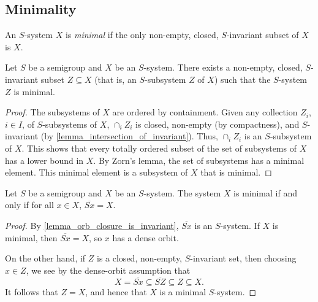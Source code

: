 \subsection{Minimality}

\begin{definition}
    \label{def_minimal_system}
    \leanok{}
    An $S$-system $X$ is \emph{minimal} if the only non-empty, closed, $S$-invariant subset of $X$ is $X$.
\end{definition}

\begin{theorem}
\label{thm_every_system_has_minimal_subsystem}
\leanok{}
    Let $S$ be a semigroup and $X$ be an $S$-system.  There exists a non-empty, closed, $S$-invariant subset $Z \subseteq X$ (that is, an $S$-subsystem $Z$ of $X$) such that the $S$-system $Z$ is minimal.
\end{theorem}

\begin{proof}
\leanok{}
    The subsystems of $X$ are ordered by containment.  Given any collection $Z_i$, $i \in I$, of $S$-subsystems of $X$, $\cap_i Z_i$ is closed, non-empty (by compactness), and $S$-invariant (by \cref{lemma_intersection_of_invariant}). Thus, $\cap_i Z_i$ is an $S$-subsystem of $X$.  This shows that every totally ordered subset of the set of subsystems of $X$ has a lower bound in $X$.  By Zorn's lemma, the set of subsystems has a minimal element.  This minimal element is a subsystem of $X$ that is minimal.
\end{proof}

\begin{theorem}
\label{thm_minimal_iff_dense_orbits}
\leanok{}
    Let $S$ be a semigroup and $X$ be an $S$-system.  The system $X$ is minimal if and only if for all $x \in X$, $\overline{Sx} = X$.
\end{theorem}

\begin{proof}
\leanok{}
    By \cref{lemma_orb_closure_is_invariant}, $\overline{Sx}$ is an $S$-system.  If $X$ is minimal, then $\overline{Sx} = X$, so $x$ has a dense orbit.

    On the other hand, if $Z$ is a closed, non-empty, $S$-invariant set, then choosing $x \in Z$, we see by the dense-orbit assumption that
    \[X = \overline{Sx} \subseteq \overline{SZ} \subseteq Z \subseteq X.\]
    It follows that $Z = X$, and hence that $X$ is a minimal $S$-system.
\end{proof}

